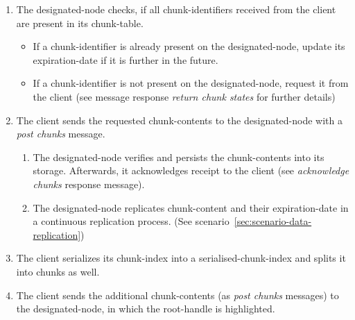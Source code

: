 \begin{enumerate}
\begin{enumerate}
            \item The \gls{designated-node} checks, if all \glspl{chunk-identifier} received from the \gls{client} are present in its \gls{chunk-table}.
                \begin{itemize}
                    \item If a \gls{chunk-identifier} is already present on the \gls{designated-node}, update its \gls{expiration-date} if it is further in the future.
                    \item If a \gls{chunk-identifier} is not present on the \gls{designated-node}, request it from the \gls{client} (see message response \emph{return chunk states} for further details)
                \end{itemize}
            \item The \gls{client} sends the requested \glspl{chunk-content} to the \gls{designated-node} with a \emph{post chunks} message. %
                \begin{enumerate}
                    \item The \gls{designated-node} verifies and persists the \glspl{chunk-content} into its \gls{storage}. Afterwards, it acknowledges receipt to the \gls{client} (see \emph{acknowledge chunks} response message).
                    \item The \gls{designated-node} replicates \gls{chunk-content} and their \gls{expiration-date} in a continuous replication process. (See scenario~\ref{sec:scenario-data-replication})
                \end{enumerate}
            \item The \gls{client} serializes its \gls{chunk-index} into a \gls{serialised-chunk-index} and splits it into \glspl{chunk} as well. %
            \item The \gls{client} sends the additional \glspl{chunk-content} (as \emph{post chunks} messages) to the \gls{designated-node}, in which the \gls{root-handle} is highlighted. %
        \end{enumerate}
\end{enumerate}

